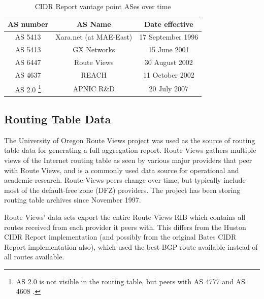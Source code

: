 \savenotes
\begin{table}[h]
    \begin{center}
    \caption{CIDR Report vantage point ASes over time}
    \vspace{1em}
    \begin{tabular}{c | c | c}
        AS number & AS Name & Date effective \\
        \hline
        AS 5413 & Xara.net (at MAE-East) & 17 September 1996 \\
        AS 5413 & GX Networks & 15 June 2001 \\
        AS 6447 & Route Views & 30 August 2002 \\
        AS 4637 & REACH & 11 October 2002 \\
        AS 2.0 \footnote{AS 2.0 is not visible in the routing table, but peers with AS 4777 and AS 4608 \cite{Huston:2011ys}.} & APNIC R\&D & 20 July 2007 \\
    \end{tabular}
    \end{center}
\end{table}
\spewnotes

\subsection{Routing Table Data}

The University of Oregon Route Views project \cite{Routeviews} was used as the source of routing table data for generating a full aggregation report. Route Views gathers multiple views of the Internet routing table as seen by various major providers that peer with Route Views, and is a commonly used data source for operational and academic research. Route Views peers change over time, but typically include most of the default-free zone (DFZ) providers. The project has been storing routing table archives since November 1997.

Route Views' data sets export the entire Route Views RIB which contains all routes received from each provider it peers with. This differs from the Huston CIDR Report implementation \cite{Huston:2011ys} (and possibly from the original Bates CIDR Report implementation also), which used the best BGP route available instead of all routes available.


